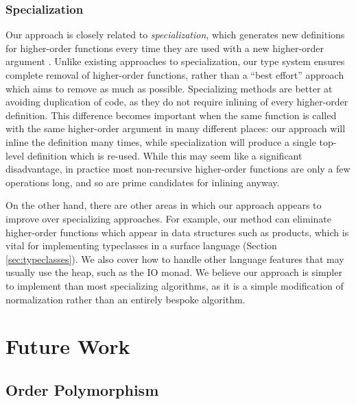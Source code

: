 \documentclass[runningheads]{llncs}
\begin{document}


\subsubsection{Specialization} \label{sec:specialization}

Our approach is closely related to \emph{specialization}, which generates new definitions for higher-order functions every time they are used with a new higher-order argument \cite{chin1996higher}. Unlike existing approaches to specialization, our type system ensures complete removal of higher-order functions, rather than a ``best effort'' approach which aims to remove as much as possible. Specializing methods are better at avoiding duplication of code, as they do not require inlining of every higher-order definition. This difference becomes important when the same function is called with the same higher-order argument in many different places: our approach will inline the definition many times, while specialization will produce a single top-level definition which is re-used. While this may seem like a significant disadvantage, in practice most non-recursive higher-order functions are only a few operations long, and so are prime candidates for inlining anyway.

On the other hand, there are other areas in which our approach appears to improve over specializing approaches. For example, our method can eliminate higher-order functions which appear in data structures such as products, which is vital for implementing typeclasses in a surface language (Section \ref{sec:typeclasses}). We also cover how to handle other language features that may usually use the heap, such as the IO monad. We believe our approach is simpler to implement than most specializing algorithms, as it is a simple modification of normalization rather than an entirely bespoke algorithm.
\section{Future Work}

\subsection{Order Polymorphism} \label{sec:order-polymorphism}
\end{document}
